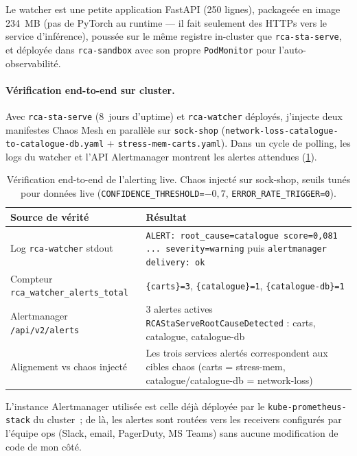 \documentclass[a4paper,11pt,oneside]{report}
\begin{document}
Le watcher est une petite application FastAPI (250 lignes), package\'ee en image 234~MB (pas de PyTorch au runtime --- il fait seulement des HTTPs vers le service d'inf\'erence), pouss\'ee sur le m\^eme registre in-cluster que \texttt{rca-sta-serve}, et d\'eploy\'ee dans \texttt{rca-sandbox} avec son propre \texttt{PodMonitor} pour l'auto-observabilit\'e.

\paragraph{V\'erification end-to-end sur cluster.}
Avec \texttt{rca-sta-serve} (8~jours d'uptime) et \texttt{rca-watcher} d\'eploy\'es, j'injecte deux manifestes Chaos Mesh en parall\`ele sur \texttt{sock-shop} (\texttt{network-loss-catalogue-to-catalogue-db.yaml} + \texttt{stress-mem-carts.yaml}). Dans un cycle de polling, les logs du watcher et l'API Alertmanager montrent les alertes attendues (\cref{tab:alerting-e2e}).

\begin{table}[ht]
\centering
\caption{V\'erification end-to-end de l'alerting live. Chaos inject\'e sur sock-shop, seuils tun\'es pour donn\'ees live (\texttt{CONFIDENCE\_THRESHOLD=$-0{,}7$}, \texttt{ERROR\_RATE\_TRIGGER=0}).}
\label{tab:alerting-e2e}
\begin{tabular}{p{}p{}}
\toprule
Source de v\'erit\'e & R\'esultat \\
\midrule
Log \texttt{rca-watcher} stdout & \texttt{ALERT: root\_cause=catalogue score=0{,}081 ... severity=warning} puis \texttt{alertmanager delivery: ok} \\
Compteur \texttt{rca\_watcher\_alerts\_total} & \texttt{\{carts\}=3}, \texttt{\{catalogue\}=1}, \texttt{\{catalogue-db\}=1} \\
Alertmanager \texttt{/api/v2/alerts} & 3 alertes actives \texttt{RCAStaServeRootCauseDetected} : carts, catalogue, catalogue-db \\
Alignement vs chaos inject\'e & Les trois services alert\'es correspondent aux cibles chaos (carts = stress-mem, catalogue/catalogue-db = network-loss) \\
\bottomrule
\end{tabular}
\end{table}

L'instance Alertmanager utilis\'ee est celle d\'ej\`a d\'eploy\'ee par le \texttt{kube-prometheus-stack} du cluster~; de l\`a, les alertes sont rout\'ees vers les receivers configur\'es par l'\'equipe ops (Slack, email, PagerDuty, MS Teams) sans aucune modification de code de mon c\^ot\'e.
\end{document}
